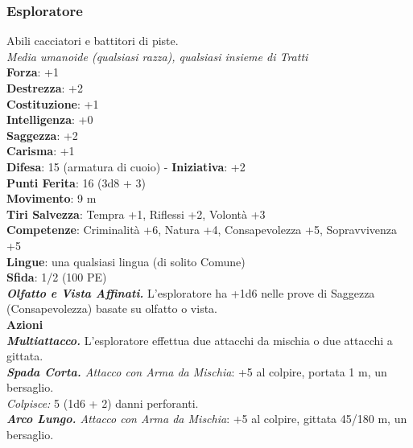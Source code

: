\begin{multicols}{2}
\subsubsection{Esploratore}
Abili cacciatori e battitori di piste.\\
\emph{Media umanoide (qualsiasi razza), qualsiasi insieme di Tratti}\\
\textbf{Forza}: +1\\
\textbf{Destrezza}: +2\\
\textbf{Costituzione}: +1\\
\textbf{Intelligenza}: +0\\
\textbf{Saggezza}: +2\\
\textbf{Carisma}: +1\\
\textbf{Difesa}: 15 (armatura di cuoio) - \textbf{Iniziativa}: +2\\
\textbf{Punti Ferita}: 16 (3d8 + 3)\\
\textbf{Movimento}: 9 m\\
\textbf{Tiri Salvezza}: Tempra +1, Riflessi +2, Volontà +3 \\
\textbf{Competenze}: Criminalità +6, Natura +4, Consapevolezza +5, Sopravvivenza +5\\
\textbf{Lingue}: una qualsiasi lingua (di solito Comune)\\
\textbf{Sfida}: 1/2 (100 PE)\smallskip\\
\emph{\textbf{Olfatto e Vista Affinati.}} L'esploratore ha +1d6 nelle prove di Saggezza (Consapevolezza) basate su olfatto o vista.\\
\smallskip\textbf{Azioni}\\
\emph{\textbf{Multiattacco.}} L'esploratore effettua due attacchi da mischia o due attacchi a gittata.\\
\emph{\textbf{Spada Corta.} Attacco con Arma da Mischia}: +5 al colpire, portata 1 m, un bersaglio.\\
\emph{Colpisce:} 5 (1d6 + 2) danni perforanti.\\
\emph{\textbf{Arco Lungo.} Attacco con Arma da Mischia}: +5 al colpire, gittata 45/180 m, un bersaglio.\\

\end{multicols}
